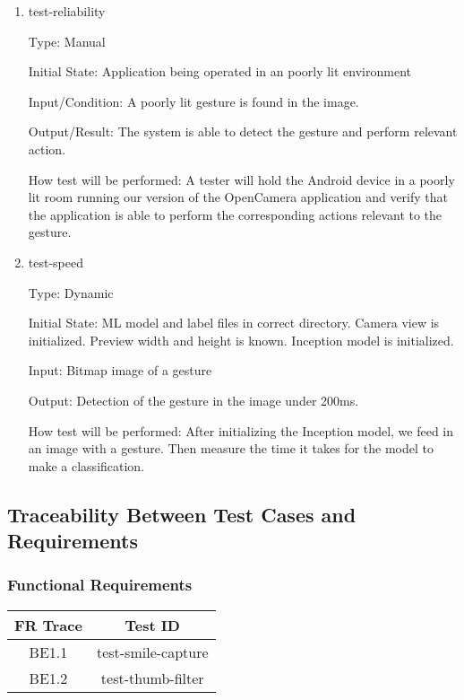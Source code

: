 \documentclass[12pt, titlepage]{article}
\begin{document}
\begin{enumerate}

\item{test-reliability\\}

Type: Manual
					
Initial State: Application being operated in an poorly lit environment
				
Input/Condition: A poorly lit gesture is found in the image.
					
Output/Result: The system is able to detect the gesture and perform relevant action.
					
How test will be performed: A tester will hold the Android device in a poorly lit room running our version of the OpenCamera application and verify that the application is able to perform the corresponding actions relevant to the gesture.
					
\item{test-speed\\}

Type: Dynamic
					
Initial State: ML model and label files in correct directory. Camera view is initialized. Preview width and height is known. Inception model is initialized. 
					
Input: Bitmap image of a gesture
					
Output: Detection of the gesture in the image under 200ms.
					
How test will be performed: After initializing the Inception model, we feed in an image with a gesture. Then measure the time it takes for the model to make a classification.

\end{enumerate}

\subsection{Traceability Between Test Cases and Requirements}

\subsubsection{Functional Requirements}

\begin{center}
\begin{tabular}{ |c|c| } 
 \hline
 FR Trace & Test ID \\ 
  \hline
   \hline
BE1.1 & test-smile-capture \\ 
  \hline
BE1.2 & test-thumb-filter \\ 
 \hline
\end{tabular}
\end{center}
\end{document}
